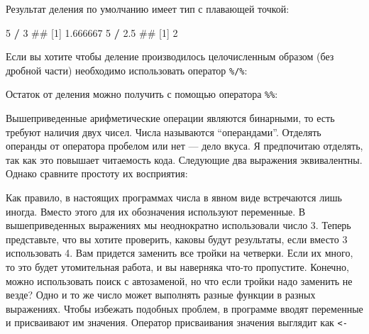 \documentclass[]{book}
\newenvironment{Shaded}{\begin{snugshade}}{\end{snugshade}}
\newcommand{\DecValTok}[1]{\textcolor[rgb]{0.00,0.00,0.81}{#1}}
\newcommand{\FloatTok}[1]{\textcolor[rgb]{0.00,0.00,0.81}{#1}}
\newcommand{\StringTok}[1]{\textcolor[rgb]{0.31,0.60,0.02}{#1}}
\newcommand{\OperatorTok}[1]{\textcolor[rgb]{0.81,0.36,0.00}{\textbf{#1}}}
\newcommand{\NormalTok}[1]{#1}
\begin{document}
Результат деления по умолчанию имеет тип с плавающей точкой:

\begin{Shaded}
\begin{Highlighting}[]
\DecValTok{5} \OperatorTok{/}\StringTok{ }\DecValTok{3}
\NormalTok{## [1] 1.666667}
\DecValTok{5} \OperatorTok{/}\StringTok{ }\FloatTok{2.5}
\NormalTok{## [1] 2}
\end{Highlighting}
\end{Shaded}

Если вы хотите чтобы деление производилось целочисленным образом (без
дробной части) необходимо использовать оператор \texttt{\%/\%}:

\begin{Shaded}
\end{Shaded}

Остаток от деления можно получить с помощью оператора \texttt{\%\%}:

\begin{Shaded}
\end{Shaded}

Вышеприведенные арифметические операции являются бинарными, то есть
требуют наличия двух чисел. Числа называются ``операндами''. Отделять
операнды от оператора пробелом или нет --- дело вкуса. Я предпочитаю
отделять, так как это повышает читаемость кода. Следующие два выражения
эквивалентны. Однако сравните простоту их восприятия:

\begin{Shaded}
\end{Shaded}

\begin{Shaded}
\end{Shaded}

Как правило, в настоящих программах числа в явном виде встречаются лишь
иногда. Вместо этого для их обозначения используют переменные. В
вышеприведенных выражениях мы неоднократно использовали число 3. Теперь
представьте, что вы хотите проверить, каковы будут результаты, если
вместо 3 использовать 4. Вам придется заменить все тройки на четверки.
Если их много, то это будет утомительная работа, и вы наверняка что-то
пропустите. Конечно, можно использовать поиск с автозаменой, но что если
тройки надо заменить не везде? Одно и то же число может выполнять разные
функции в разных выражениях. Чтобы избежать подобных проблем, в
программе вводят переменные и присваивают им значения. Оператор
присваивания значения выглядит как \texttt{\textless{}-}
\end{document}
